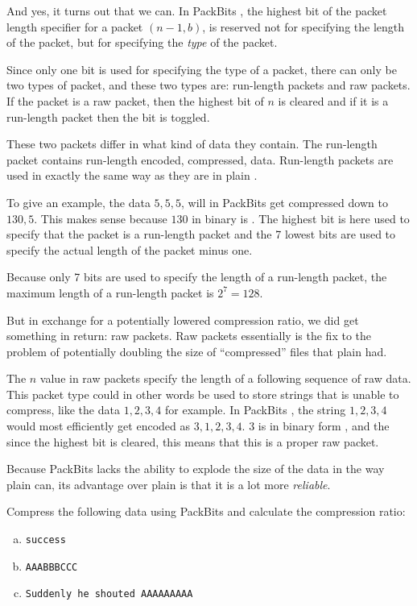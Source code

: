 And yes, it turns out that we can. In PackBits \rle, the highest bit of
the packet length specifier for a packet $(n-1,b)$, is reserved not
for specifying the length of the packet, but for specifying the
\textit{type} of the packet.

Since only one bit is used for specifying the type of a packet, there
can only be two types of packet, and these two types are: run-length
packets and raw packets. If the packet is a raw packet, then the
highest bit of $n$ is cleared and if it is a run-length packet then
the bit is toggled.

These two packets differ in what kind of data they contain. The
run-length packet contains run-length encoded, compressed,
data. Run-length packets are used in exactly the same way as they are
in plain \rle.

To give an example, the data $5,5,5$, will in PackBits \rle get
compressed down to $130,5$. This makes sense because $130$ in binary
is . The highest bit is here used to specify that the
packet is a run-length packet and the 7 lowest bits are used to
specify the actual length of the packet minus one.

Because only 7 bits are used to specify the length of a run-length
packet, the maximum length of a run-length packet is $2^7 = 128$.

But in exchange for a potentially lowered compression ratio, we did
get something in return: raw packets. Raw packets essentially is the
fix to the problem of potentially doubling the size of ``compressed''
files that plain \rle had.

The $n$ value in raw packets specify the length of a following
sequence of raw data. This packet type could in other words be used to
store strings that \rle is unable to compress, like the data $1,2,3,4$
for example. In PackBits \rle, the string $1,2,3,4$ would most
efficiently get encoded as $3,1,2,3,4$. $3$ is in binary form , and the since the highest bit is cleared, this means that this
is a proper raw packet.

Because PackBits \rle lacks the ability to explode the size of the
data in the way plain \rle can, its advantage over plain \rle is that
it is a lot more \textit{reliable}.

\begin{Exercise}[label={packbits-rle}]

  Compress the following data using PackBits \rle and calculate the
  compression ratio:

  \begin{enumerate}[(a)]
  \item \texttt{success}
  \item \texttt{AAABBBCCC}
  \item \texttt{Suddenly he shouted AAAAAAAAA}
  \end{enumerate}

\end{Exercise}

